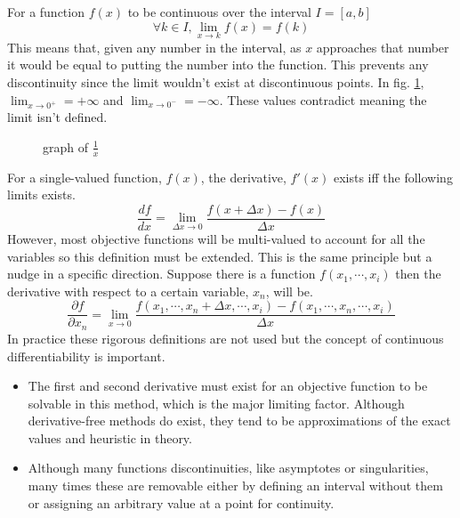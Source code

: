 \documentclass[10pt,a4paper]{report}
\begin{document}
				For a function $f(x)$ to be continuous over the interval $I = [a,b]$
				\begin{equation}
					\forall k \in I, \lim_{x \to k} f(x) = f(k)
					\label{eq:continuity}
				\end{equation}
				This means that, given any number in the interval, as $x$ approaches that number it would be equal to putting
				the number into the function. This prevents any discontinuity since the limit wouldn't exist at discontinuous points. In fig. \ref{fig:discontinuity},
				$\lim_{x \to 0^+} = +\infty$ and $\lim_{x \to 0^-} = -\infty$. These values contradict meaning the limit isn't defined.
				\begin{figure}[h]
					\centering
					\caption{graph of $\frac{1}{x}$}
					\label{fig:discontinuity}
				\end{figure}

				For a single-valued function, $f(x)$, the derivative, $f'(x)$ exists iff the following limits exists.
				\begin{equation}
					\frac{df}{dx} = \lim_{\Delta x \to 0} \frac{f(x+\Delta x) - f(x)}{\Delta x}
					\label{eq:first-principles-uni}
				\end{equation}
				However, most objective functions will be multi-valued to account for all the variables so this
				definition must be extended. This is the same principle but a nudge in a specific direction. Suppose
				there is a function $f(x_1,\cdots,x_i)$ then the derivative with respect to a certain variable, $x_n$, will be.
				\begin{equation}
					\frac{\partial f}{\partial x_n} = \lim_{x \to 0} \frac{f(x_1,\cdots,x_n+\Delta x,\cdots,x_i) - f(x_1, \cdots,x_n,\cdots,x_i)}{\Delta x}
					\label{eq:first-principles-multi}
				\end{equation}
				In practice these rigorous definitions are not used but the concept of continuous differentiability is important.
				\begin{itemize}
					\item The first and second derivative must exist for an objective function to be solvable in this method,
					which is the major limiting factor. Although derivative-free methods do exist,
					they tend to be approximations of the exact values and heuristic in theory.
					\item Although many functions discontinuities, like asymptotes or singularities, many times these are
					removable either by defining an interval without them or assigning an arbitrary value at a point for continuity.
				\end{itemize}
\end{document}
